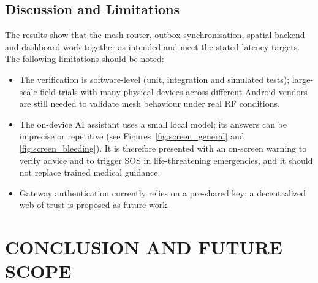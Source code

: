 \documentclass[12pt,a4paper]{report}
\begin{document}
\section{Discussion and Limitations}
The results show that the mesh router, outbox synchronisation, spatial backend and dashboard work together as intended and meet the stated latency targets. The following limitations should be noted:
\begin{itemize}
    \item The verification is software-level (unit, integration and simulated tests); large-scale field trials with many physical devices across different Android vendors are still needed to validate mesh behaviour under real RF conditions.
    \item The on-device AI assistant uses a small local model; its answers can be imprecise or repetitive (see Figures~\ref{fig:screen_general} and \ref{fig:screen_bleeding}). It is therefore presented with an on-screen warning to verify advice and to trigger SOS in life-threatening emergencies, and it should not replace trained medical guidance.
    \item Gateway authentication currently relies on a pre-shared key; a decentralized web of trust is proposed as future work.
\end{itemize}

\chapter{CONCLUSION AND FUTURE SCOPE}
\end{document}
